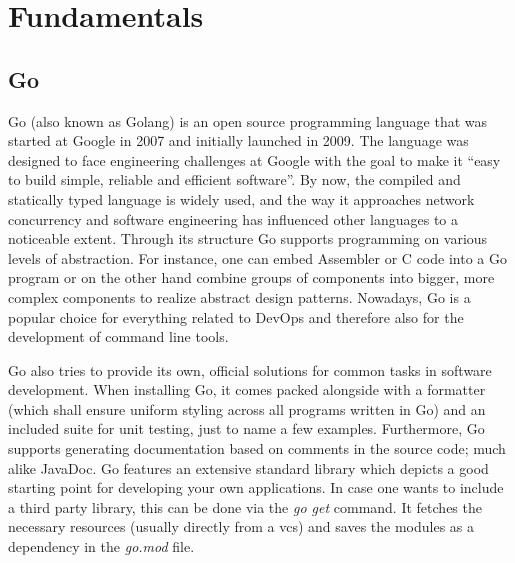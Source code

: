 \chapter{Fundamentals}
\section{Go}
Go (also known as Golang) is an open source programming language that was started at Google in 2007 and initially launched in 2009.
The language was designed to face engineering challenges at Google with the goal to make it \enquote{easy to build simple, reliable and efficient software}. \cite{pike.2020, golang.github}
By now, the compiled and statically typed language \cite{chris.2021} is widely used, and the way it approaches network concurrency and software engineering has influenced other languages to a noticeable extent. \cite{pike.2020}
Through its structure Go supports programming on various levels of abstraction.
For instance, one can embed Assembler or C code into a Go program or on the other hand combine groups of components into bigger, more complex components to realize abstract design patterns. \cite{Maurer2021}
Nowadays, Go is a popular choice for everything related to DevOps and therefore also for the development of command line tools. \cite{mike.2020}

Go also tries to provide its own, official solutions for common tasks in software development.
When installing Go, it comes packed alongside with a formatter (which shall ensure uniform styling across all programs written in Go) and an included suite for unit testing, just to name a few examples.
Furthermore, Go supports generating documentation based on comments in the source code; much alike JavaDoc.
Go features an extensive standard library which depicts a good starting point for developing your own applications.
In case one wants to include a third party library, this can be done via the \emph{go get} command.
It fetches the necessary resources (usually directly from a \ac{vcs}) and saves the modules as a dependency in the \emph{go.mod} file. \cite{go.tour, go.docs}


